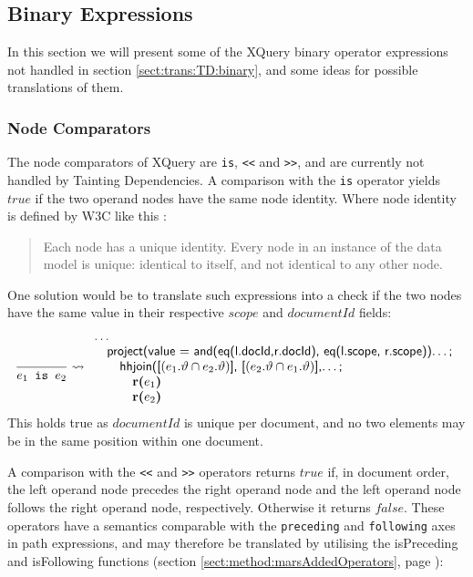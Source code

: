 \subsection{Binary Expressions}
\label{sect:disc:not:binary}
In this section we will present some of the XQuery binary operator expressions not handled in section
\ref{sect:trans:TD:binary}, and some ideas for possible translations of them.

\subsubsection{Node Comparators}

The node comparators of XQuery are \texttt{is}, \texttt{<<} and \texttt{>>}, and are currently not handled by
Tainting Dependencies. A comparison with the \texttt{is} operator yields $true$ if the two operand nodes have the
same node identity. Where node identity is defined by W3C like this \cite{w3c04}:
\begin{quote}
Each node has a unique identity. Every node in an instance of the data model is unique: identical to itself, and
not identical to any other node.
\end{quote}

One solution would be to translate such expressions into a check if the two nodes have the same value in their
respective $scope$ and $documentId$ fields:
\begin{equation*}
\frac{}{e_1 \mbox{\texttt{ is }} e_2} \leadsto
\begin{array}{l}
\mbox{\textsf{\ldots}} \\ \quad
\mbox{\textsf{project(value = and(eq(l.docId,r.docId), eq(l.scope, r.scope))\ldots;}} \\ \quad\quad
\mbox{\textsf{hhjoin([}}(e_1.\vartheta\cap e_2.\vartheta)\mbox{\textsf{], [}}(e_2.\vartheta\cap e_1.\vartheta)
\mbox{\textsf{],\ldots;}} \\ \quad\quad \quad
\mbox{\textbf{r(}}e_1\mbox{\textbf{)}} \\ \quad\quad \quad
\mbox{\textbf{r(}}e_2\mbox{\textbf{)}}
\end{array}
\end{equation*}
This holds true as $documentId$ is unique per document, and no two elements may be in the same position within one
document.

A comparison with the \texttt{<<} and \texttt{>>} operators returns $true$ if, in document order, the left operand
node precedes the right operand node and the left operand node follows the right operand node, respectively.
Otherwise it returns $false$. These operators have a semantics comparable with the \texttt{preceding} and
\texttt{following} axes in path expressions, and may therefore be translated by utilising the \textsf{isPreceding}
and \textsf{isFollowing} functions (section \ref{sect:method:marsAddedOperators}, page
\pageref{sect:method:marsAddedOperators}):

